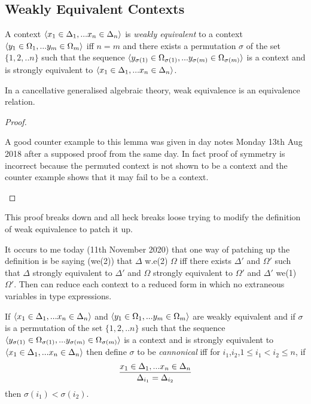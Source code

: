 \documentclass[10pt,a4paper]{scrartcl}
\begin{document}
\subsection{Weakly Equivalent Contexts}
\begin{definition}
A context $\langle x_1 \in \Delta_1,... x_{n} \in \Delta_{n}\rangle$ 
is \textit{weakly equivalent} to a context $\langle y_1 \in \Omega_1,... y_{m} \in \Omega_{m}\rangle$  iff $n=m$ and there exists a permutation $\sigma$ of the set $\{1,2,..n\}$
such that the sequence 
$\langle y_{\sigma(1)} \in \Omega_{\sigma(1)},... y_{\sigma(m)} \in \Omega_{\sigma(m)}\rangle$
is a context and 
is strongly equivalent to $\langle x_1 \in \Delta_1,... x_{n} \in \Delta_{n}\rangle$.
\end{definition}
\begin{lemma}
In a cancellative generalised algebraic theory, weak equivalence is an
equivalence relation.
\end{lemma}
\begin{proof}
\tbd{}

\begin{framed}
A good counter example to this lemma was given in day notes Monday 13th Aug 2018 after a supposed proof from the same day.
In fact proof of symmetry is incorrect because the permuted context is not shown to be a context and the counter example shows that
it may fail to be a context.
\end{framed}
\end{proof}

\begin{framed}
This proof breaks down and all heck breaks loose trying to modify the definition of weak equivalence to patch it up.
\end{framed}

\begin{framed}
It occurs to me today (11th November 2020) that one way of patching up the definition is be saying (we(2))
that $\Delta$ w.e(2) $\Omega$ iff there exists $\Delta'$ and $\Omega'$ such that $\Delta$ strongly equivalent to $\Delta'$
and $\Omega$ strongly equivalent to $\Omega'$ and $\Delta'$ we(1) $\Omega'$. Then can reduce each context to a reduced form in which 
no extraneous variables in type expressions.
\end{framed}
\noindent 
If $\langle x_1 \in \Delta_1,... x_{n} \in \Delta_{n}\rangle$ 
and $\langle y_1 \in \Omega_1,... y_{m} \in \Omega_{m}\rangle$ are weakly equivalent 
and if $\sigma$ is a permutation of the set $\{1,2,..n\}$
such that the sequence 
$\langle y_{\sigma(1)} \in \Omega_{\sigma(1)},... y_{\sigma(m)} \in \Omega_{\sigma(m)}\rangle$
is a context and 
is strongly equivalent to $\langle x_1 \in \Delta_1,... x_{n} \in \Delta_{n}\rangle$
then define $\sigma$ to be \textit{cannonical} iff
for $i_1$,$i_2$,$1 \leq i_1  < i_2 \leq n$, if 
$$
\frac{x_1 \in \Delta_1,... x_{n} \in \Delta_{n}}{\Delta_{i_1}=\Delta_{i_2}}
$$
then $\sigma(i_1) < \sigma(i_2)$.\\
\end{document}
